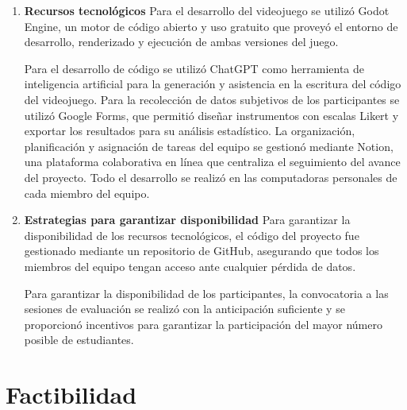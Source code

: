 \begin{enumerate}[label=\alph*]
    La población del estudio fue constituida por estudiantes de la Universidad del Valle de Guatemala (UVG). Tras interactuar con ambas versiones del videojuego en la prueba A/B, los participantes completaron un cuestionario psicométrico basado en la escala Likert como instrumento de evaluación subjetiva. Los reactivos de la encuesta se diferenciaron según la condición experimental del sujeto: el grupo informado evaluó las mecánicas identificando explícitamente el origen de cada versión, mientras que el grupo no informado (ciego) respondió bajo un esquema de evaluación neutral, permitiendo aislar el sesgo ideológico de la calidad técnica percibida. 
    \item \textbf{Recursos tecnológicos}\newline
    Para el desarrollo del videojuego se utilizó Godot Engine, un motor de código abierto y uso gratuito \cite{godot2026docs} que proveyó el entorno de desarrollo, renderizado y ejecución de ambas versiones del juego.

    Para el desarrollo de código se utilizó ChatGPT como herramienta de inteligencia artificial para la generación y asistencia en la escritura del código del videojuego. Para la recolección de datos subjetivos de los participantes se utilizó Google Forms, que permitió diseñar instrumentos con escalas Likert y exportar los resultados para su análisis estadístico. La organización, planificación y asignación de tareas del equipo se gestionó mediante Notion, una plataforma colaborativa en línea que centraliza el seguimiento del avance del proyecto. Todo el desarrollo se realizó en las computadoras personales de cada miembro del equipo.
    \item \textbf{Estrategias para garantizar disponibilidad} \newline
    Para garantizar la disponibilidad de los recursos tecnológicos, el código del proyecto fue gestionado mediante un repositorio de GitHub, asegurando que todos los miembros del equipo tengan acceso ante cualquier pérdida de datos.

    Para garantizar la disponibilidad de los participantes, la convocatoria a las sesiones de evaluación se realizó con la anticipación suficiente y se proporcionó incentivos para garantizar la participación del mayor número posible de estudiantes.
\end{enumerate}

\section{Factibilidad}

